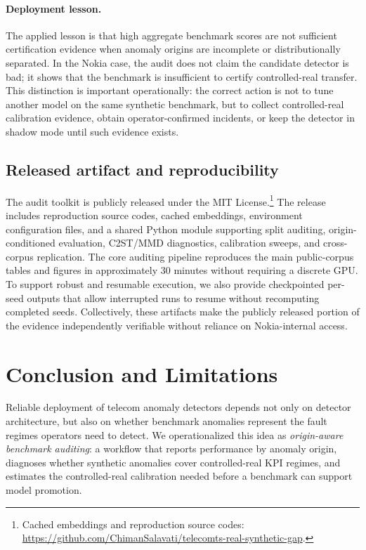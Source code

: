\documentclass[sigconf,review]{acmart}
\begin{document}
\paragraph{Deployment lesson.}
The applied lesson is that high aggregate benchmark scores are not sufficient certification evidence when anomaly origins are incomplete or distributionally separated. In the Nokia case, the audit does not claim the candidate detector is bad; it shows that the benchmark is insufficient to certify controlled-real transfer. This distinction is important operationally: the correct action is not to tune another model on the same synthetic benchmark, but to collect controlled-real calibration evidence, obtain operator-confirmed incidents, or keep the detector in shadow mode until such evidence exists.

\subsection{Released artifact and reproducibility}
The audit toolkit is publicly released under the MIT License.\footnote{Cached embeddings and reproduction source codes: \url{https://github.com/ChimanSalavati/telecomts-real-synthetic-gap}.}
The release includes reproduction source codes, cached embeddings, environment configuration files, and a shared Python module supporting split auditing, origin-conditioned evaluation, C2ST/MMD diagnostics, calibration sweeps, and cross-corpus replication. The core auditing pipeline reproduces the main public-corpus tables and figures in approximately 30 minutes without requiring a discrete GPU. To support robust and resumable execution, we also provide checkpointed per-seed outputs that allow interrupted runs to resume without recomputing completed seeds. Collectively, these artifacts make the publicly released portion of the evidence independently verifiable without reliance on Nokia-internal access.
\section{Conclusion and Limitations}
\label{sec:conclusion-limits}

Reliable deployment of telecom anomaly detectors depends not only on detector architecture, but also on whether benchmark anomalies represent the fault regimes operators need to detect. We operationalized this idea as \emph{origin-aware benchmark auditing}: a workflow that reports performance by anomaly origin, diagnoses whether synthetic anomalies cover controlled-real KPI regimes, and estimates the controlled-real calibration needed before a benchmark can support model promotion.
\end{document}
